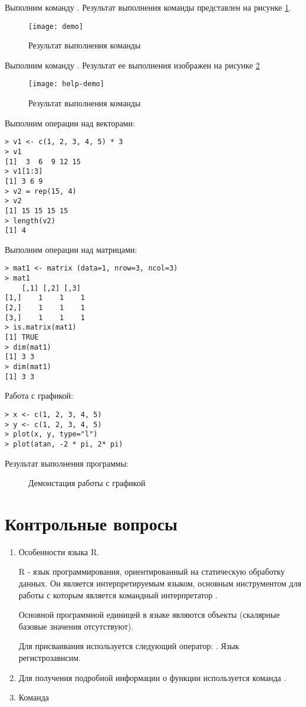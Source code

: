 \documentclass[a4paper,14pt]{extarticle}
\begin{document}
Выполним команду . Результат выполнения команды представлен
на рисунке \ref{fig:demo}.
\begin{figure}[H]
    \centering
    \texttt{[image: demo]}
    \caption{Результат выполнения команды }
    \label{fig:demo}
\end{figure}

Выполним команду . Результат ее выполнения изображен на рисунке \ref{fig:help-demo}
\begin{figure}[H]
    \centering
    \texttt{[image: help-demo]}
    \caption{Результат выполнения команды }
    \label{fig:help-demo}
\end{figure}

Выполним операции над векторами:
\begin{lstlisting}
> v1 <- c(1, 2, 3, 4, 5) * 3
> v1
[1]  3  6  9 12 15
> v1[1:3]
[1] 3 6 9
> v2 = rep(15, 4)
> v2
[1] 15 15 15 15
> length(v2)
[1] 4
\end{lstlisting}

Выполним операции над матрицами:
\begin{lstlisting}
> mat1 <- matrix (data=1, nrow=3, ncol=3)
> mat1
    [,1] [,2] [,3]
[1,]    1    1    1
[2,]    1    1    1
[3,]    1    1    1
> is.matrix(mat1)
[1] TRUE
> dim(mat1)
[1] 3 3
> dim(mat1)
[1] 3 3
\end{lstlisting}

Работа с графикой:
\begin{lstlisting}
> x <- c(1, 2, 3, 4, 5)
> y <- c(1, 2, 3, 4, 5)
> plot(x, y, type="l")
> plot(atan, -2 * pi, 2* pi)
\end{lstlisting}

Результат выполнения программы:
\begin{figure}[H]
    \centering
    \subfloat[y = x]{\texttt{[image: y=x]}}
    \hspace{.15\linewidth}
    \caption{Демонстация работы с графикой}
\end{figure}

\section{Контрольные вопросы}
\begin{enumerate}
    \item Особенности языка R.
    
    R - язык программирования, ориентированный на статическую обработку данных.
    Он является интерпретируемым языком, основным инструментом для работы с
    которым является командный интерпретатор .

    Основной программной единицей в языке являются объекты (скалярные базовые
    значения отсутствуют).

    Для присваивания используется следующий оператор: \code{<-}. Язык регистрозависим.

    \item Для получения подробной информации о функции используется команда .
    \item Команда 
\end{enumerate}
\end{document}
